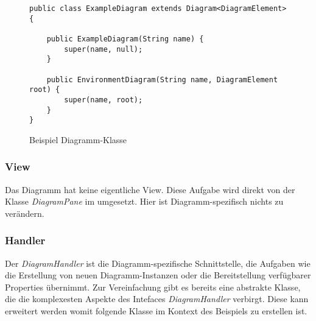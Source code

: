 \begin{figure}[h!]
	\centering
	\begin{lstlisting}
public class ExampleDiagram extends Diagram<DiagramElement> {

    public ExampleDiagram(String name) {
        super(name, null);
    }

    public EnvironmentDiagram(String name, DiagramElement root) {
        super(name, root);
    }
}
	\end{lstlisting}
	\caption{Beispiel Diagramm-Klasse}
\end{figure}

\subsubsection{View}
Das Diagramm hat keine eigentliche View. Diese Aufgabe wird direkt von der Klasse \textit{DiagramPane} im
\textit{} umgesetzt. Hier ist Diagramm-spezifisch nichts zu verändern.

\subsubsection{Handler}
Der \textit{DiagramHandler} ist die Diagramm-spezifische Schnittstelle, die Aufgaben wie die Erstellung von neuen
Diagramm-Instanzen oder die Bereitstellung verfügbarer Properties übernimmt. Zur Vereinfachung gibt es bereits eine
abstrakte Klasse, die die komplexesten Aspekte des Intefaces \textit{DiagramHandler} verbirgt. Diese kann erweitert
werden womit folgende Klasse im Kontext des Beispiels zu erstellen ist.

